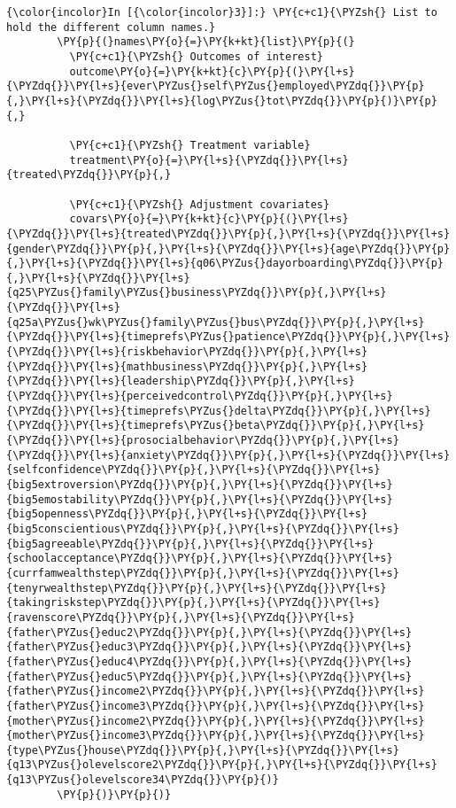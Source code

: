    \begin{Verbatim}[commandchars=\\\{\}]
{\color{incolor}In [{\color{incolor}3}]:} \PY{c+c1}{\PYZsh{} List to hold the different column names.}
        \PY{p}{(}names\PY{o}{=}\PY{k+kt}{list}\PY{p}{(}
          \PY{c+c1}{\PYZsh{} Outcomes of interest}
          outcome\PY{o}{=}\PY{k+kt}{c}\PY{p}{(}\PY{l+s}{\PYZdq{}}\PY{l+s}{ever\PYZus{}self\PYZus{}employed\PYZdq{}}\PY{p}{,}\PY{l+s}{\PYZdq{}}\PY{l+s}{log\PYZus{}tot\PYZdq{}}\PY{p}{)}\PY{p}{,}
        
          \PY{c+c1}{\PYZsh{} Treatment variable}
          treatment\PY{o}{=}\PY{l+s}{\PYZdq{}}\PY{l+s}{treated\PYZdq{}}\PY{p}{,}
        
          \PY{c+c1}{\PYZsh{} Adjustment covariates}
          covars\PY{o}{=}\PY{k+kt}{c}\PY{p}{(}\PY{l+s}{\PYZdq{}}\PY{l+s}{treated\PYZdq{}}\PY{p}{,}\PY{l+s}{\PYZdq{}}\PY{l+s}{gender\PYZdq{}}\PY{p}{,}\PY{l+s}{\PYZdq{}}\PY{l+s}{age\PYZdq{}}\PY{p}{,}\PY{l+s}{\PYZdq{}}\PY{l+s}{q06\PYZus{}dayorboarding\PYZdq{}}\PY{p}{,}\PY{l+s}{\PYZdq{}}\PY{l+s}{q25\PYZus{}family\PYZus{}business\PYZdq{}}\PY{p}{,}\PY{l+s}{\PYZdq{}}\PY{l+s}{q25a\PYZus{}wk\PYZus{}family\PYZus{}bus\PYZdq{}}\PY{p}{,}\PY{l+s}{\PYZdq{}}\PY{l+s}{timeprefs\PYZus{}patience\PYZdq{}}\PY{p}{,}\PY{l+s}{\PYZdq{}}\PY{l+s}{riskbehavior\PYZdq{}}\PY{p}{,}\PY{l+s}{\PYZdq{}}\PY{l+s}{mathbusiness\PYZdq{}}\PY{p}{,}\PY{l+s}{\PYZdq{}}\PY{l+s}{leadership\PYZdq{}}\PY{p}{,}\PY{l+s}{\PYZdq{}}\PY{l+s}{perceivedcontrol\PYZdq{}}\PY{p}{,}\PY{l+s}{\PYZdq{}}\PY{l+s}{timeprefs\PYZus{}delta\PYZdq{}}\PY{p}{,}\PY{l+s}{\PYZdq{}}\PY{l+s}{timeprefs\PYZus{}beta\PYZdq{}}\PY{p}{,}\PY{l+s}{\PYZdq{}}\PY{l+s}{prosocialbehavior\PYZdq{}}\PY{p}{,}\PY{l+s}{\PYZdq{}}\PY{l+s}{anxiety\PYZdq{}}\PY{p}{,}\PY{l+s}{\PYZdq{}}\PY{l+s}{selfconfidence\PYZdq{}}\PY{p}{,}\PY{l+s}{\PYZdq{}}\PY{l+s}{big5extroversion\PYZdq{}}\PY{p}{,}\PY{l+s}{\PYZdq{}}\PY{l+s}{big5emostability\PYZdq{}}\PY{p}{,}\PY{l+s}{\PYZdq{}}\PY{l+s}{big5openness\PYZdq{}}\PY{p}{,}\PY{l+s}{\PYZdq{}}\PY{l+s}{big5conscientious\PYZdq{}}\PY{p}{,}\PY{l+s}{\PYZdq{}}\PY{l+s}{big5agreeable\PYZdq{}}\PY{p}{,}\PY{l+s}{\PYZdq{}}\PY{l+s}{schoolacceptance\PYZdq{}}\PY{p}{,}\PY{l+s}{\PYZdq{}}\PY{l+s}{currfamwealthstep\PYZdq{}}\PY{p}{,}\PY{l+s}{\PYZdq{}}\PY{l+s}{tenyrwealthstep\PYZdq{}}\PY{p}{,}\PY{l+s}{\PYZdq{}}\PY{l+s}{takingriskstep\PYZdq{}}\PY{p}{,}\PY{l+s}{\PYZdq{}}\PY{l+s}{ravenscore\PYZdq{}}\PY{p}{,}\PY{l+s}{\PYZdq{}}\PY{l+s}{father\PYZus{}educ2\PYZdq{}}\PY{p}{,}\PY{l+s}{\PYZdq{}}\PY{l+s}{father\PYZus{}educ3\PYZdq{}}\PY{p}{,}\PY{l+s}{\PYZdq{}}\PY{l+s}{father\PYZus{}educ4\PYZdq{}}\PY{p}{,}\PY{l+s}{\PYZdq{}}\PY{l+s}{father\PYZus{}educ5\PYZdq{}}\PY{p}{,}\PY{l+s}{\PYZdq{}}\PY{l+s}{father\PYZus{}income2\PYZdq{}}\PY{p}{,}\PY{l+s}{\PYZdq{}}\PY{l+s}{father\PYZus{}income3\PYZdq{}}\PY{p}{,}\PY{l+s}{\PYZdq{}}\PY{l+s}{mother\PYZus{}income2\PYZdq{}}\PY{p}{,}\PY{l+s}{\PYZdq{}}\PY{l+s}{mother\PYZus{}income3\PYZdq{}}\PY{p}{,}\PY{l+s}{\PYZdq{}}\PY{l+s}{type\PYZus{}house\PYZdq{}}\PY{p}{,}\PY{l+s}{\PYZdq{}}\PY{l+s}{q13\PYZus{}olevelscore2\PYZdq{}}\PY{p}{,}\PY{l+s}{\PYZdq{}}\PY{l+s}{q13\PYZus{}olevelscore34\PYZdq{}}\PY{p}{)}
        \PY{p}{)}\PY{p}{)}
\end{Verbatim}

